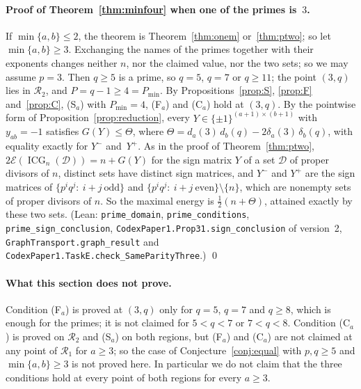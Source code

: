 \documentclass[11pt]{article}
\theoremstyle{remark}
\newcommand{\ICG}{\operatorname{ICG}}
\newcommand{\E}{\mathcal E}
\begin{document}
\paragraph{Proof of Theorem~\ref{thm:minfour} when one of the primes is~$3$.} If
$\min\{a,b\}\le2$, the theorem is Theorem~\ref{thm:onem} or~\ref{thm:ptwo}; so let
$\min\{a,b\}\ge3$. Exchanging the names of the primes together with their
exponents changes neither $n$, nor the claimed value, nor the two sets; so we may
assume $p=3$. Then $q\ge5$ is a prime, so $q=5$, $q=7$ or $q\ge11$; the point
$(3,q)$ lies in $\mathcal R_2$, and $P=q-1\ge4=P_{\min}$. By
Propositions~\ref{prop:S}, \ref{prop:F} and~\ref{prop:C}, (S$_a$) with
$P_{\min}=4$, (F$_a$) and (C$_a$) hold at $(3,q)$. By the pointwise form of
Proposition~\ref{prop:reduction}, every $Y\in\{\pm1\}^{(a+1)\times(b+1)}$ with
$y_{ab}=-1$ satisfies $G(Y)\le\Theta$, where
$\Theta=d_a(3)\,d_b(q)-2\delta_a(3)\,\delta_b(q)$, with equality exactly for $Y^-$
and~$Y^+$. As in the proof of Theorem~\ref{thm:ptwo},
$2\E(\ICG_n(\mathcal D))=n+G(Y)$ for the sign matrix $Y$ of a set $\mathcal D$ of
proper divisors of $n$, distinct sets have distinct sign matrices, and $Y^-$ and
$Y^+$ are the sign matrices of $\{p^iq^j:\ i+j\ \text{odd}\}$ and
$\{p^iq^j:\ i+j\ \text{even}\}\setminus\{n\}$, which are nonempty sets of proper
divisors of $n$. So the maximal energy is $\frac12(n+\Theta)$, attained exactly by
these two sets. (Lean: \texttt{prime\_domain}, \texttt{prime\_conditions},
\texttt{prime\_sign\_conclusion}, \texttt{CodexPaper1.Prop31.sign\_conclusion} of
version~2, \texttt{GraphTransport.graph\_result} and
\texttt{CodexPaper1.TaskE.check\_SameParityThree}.) \qed

\paragraph{What this section does not prove.} Condition (F$_a$) is proved at
$(3,q)$ only for $q=5$, $q=7$ and $q\ge8$, which is enough for the primes; it is not
claimed for $5<q<7$ or $7<q<8$. Condition (C$_a$) is proved on $\mathcal R_2$ and
(S$_a$) on both regions, but (F$_a$) and (C$_a$) are not claimed at any point of
$\mathcal R_1$ for $a\ge3$; so the case of Conjecture~\ref{conj:equal} with
$p,q\ge5$ and $\min\{a,b\}\ge3$ is not proved here. In particular we do not claim
that the three conditions hold at every point of both regions for every
$a\ge3$.
\end{document}
